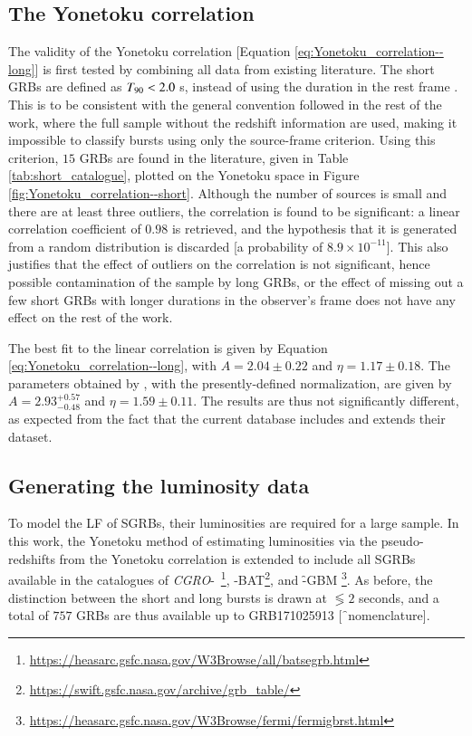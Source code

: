 \subsection{The Yonetoku correlation}
\label{subsec:Yonetoku_correlation--short}
The validity of the Yonetoku correlation [Equation \ref{eq:Yonetoku_correlation--long}] is first tested by combining all data from existing literature. The short GRBs are defined as $T_{\rm{90}} < 2.0$ s, instead of using the duration in the rest frame . This is to be consistent with the general convention followed in the rest of the work, where the full sample without the redshift information are used, making it impossible to classify bursts using only the source-frame criterion. Using this criterion, $15$ GRBs are found in the literature, given in Table \ref{tab:short_catalogue}, plotted on the Yonetoku space in Figure \ref{fig:Yonetoku_correlation--short}. Although the number of sources is small and there are at least three outliers, the correlation is found to be significant: a linear correlation coefficient of $0.98$ is retrieved, and the hypothesis that it is generated from a random distribution is discarded [a probability of $8.9 \times 10^{-11}$]. This also justifies that the effect of outliers on the correlation is not significant, hence possible contamination of the sample by long GRBs, or the effect of missing out a few short GRBs with longer durations in the observer's frame \citep{Zhang_et_al.-2009-ApJ} does not have any effect on the rest of the work.

The best fit to the linear correlation is given by Equation \ref{eq:Yonetoku_correlation--long}, with $A = 2.04 \pm 0.22$ and $\eta = 1.17 \pm 0.18$. The parameters obtained by , with the presently-defined normalization, are given by $A = 2.93^{+0.57}_{-0.48}$ and $\eta = 1.59 \pm 0.11$. The results are thus not significantly different, as expected from the fact that the current database includes and extends their dataset.



\subsection{Generating the luminosity data}
\label{subsec:L-z_data_generation--short}
To model the LF of SGRBs, their luminosities are required for a large sample. In this work, the Yonetoku method of estimating luminosities via the pseudo-redshifts from the Yonetoku correlation is extended to include all SGRBs available in the catalogues of \emph{CGRO}-\B\ \citep{BATSE_catalogue--1997}\footnote{\url{https://heasarc.gsfc.nasa.gov/W3Browse/all/batsegrb.html}}, \s -BAT\footnote{\url{https://swift.gsfc.nasa.gov/archive/grb_table/}}, and \f -GBM \citep{Fermi_catalgoue--2016-ApJS}\footnote{\url{https://heasarc.gsfc.nasa.gov/W3Browse/fermi/fermigbrst.html}}. As before, the distinction between the short and long bursts is drawn at $\lessgtr 2$ seconds, and a total of $757$ GRBs are thus available up to GRB171025913 [\f\ nomenclature].

